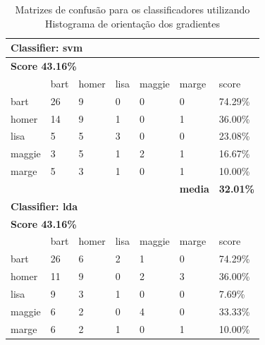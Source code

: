 \documentclass[journal]{IEEEtran}
\begin{document}
\begin{table}[!htb]
\centering
\caption{Matrizes de confusão para os classificadores utilizando Histograma de orientação dos gradientes}
\label{tbl:hog}
\small
\singlespacing
\begin{tabular}{l|l|l|l|l|l|l} \hline
\multicolumn{7}{l}{\textbf{Classifier: svm}}                                                \\ \hline
\multicolumn{7}{l}{\textbf{Score 43.16\%}}                                                  \\ \hline
          & bart      & homer     & lisa      & maggie    & marge          & score            \\ \hline
bart      & 26        & 9         & 0         & 0         & 0              & 74.29\%          \\ \hline
homer     & 14        & 9         & 1         & 0         & 1              & 36.00\%          \\ \hline
lisa      & 5         & 5         & 3         & 0         & 0              & 23.08\%          \\ \hline
maggie    & 3         & 5         & 1         & 2         & 1              & 16.67\%          \\ \hline
marge     & 5         & 3         & 1         & 0         & 1              & 10.00\%          \\ \hline
          &           &           &           &           & \textbf{media} & \textbf{32.01\%} \\ \hline
\multicolumn{7}{l}{\textbf{Classifier: lda}}                                                \\ \hline
\multicolumn{7}{l}{\textbf{Score 43.16\%}}                                                  \\ \hline
          & bart      & homer     & lisa      & maggie    & marge          & score            \\ \hline
bart      & 26        & 6         & 2         & 1         & 0              & 74.29\%          \\ \hline
homer     & 11        & 9         & 0         & 2         & 3              & 36.00\%          \\ \hline
lisa      & 9         & 3         & 1         & 0         & 0              & 7.69\%           \\ \hline
maggie    & 6         & 2         & 0         & 4         & 0              & 33.33\%          \\ \hline
marge     & 6         & 2         & 1         & 0         & 1              & 10.00\%          \\ \hline

\end{tabular}
\end{table}
\end{document}
